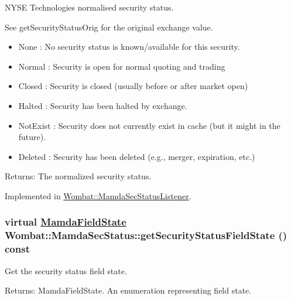 NYSE Technologies normalised security status. 

See get\-Security\-Status\-Orig for the original exchange value.

\begin{itemize}
\item None : No security status is known/available for this security. \item Normal : Security is open for normal quoting and trading \item Closed : Security is closed (usually before or after market open) \item Halted : Security has been halted by exchange. \item Not\-Exist : Security does not currently exist in cache (but it might in the future). \item Deleted : Security has been deleted (e.g., merger, expiration, etc.)  \end{itemize}


\begin{Desc}
\item[Returns:]The normalized security status. \end{Desc}


Implemented in \hyperlink{classWombat_1_1MamdaSecStatusListener_b1b6d523017888af27f4c3745c2e7fc0}{Wombat::Mamda\-Sec\-Status\-Listener}.\hypertarget{classWombat_1_1MamdaSecStatus_1b7b8b27b2bf2302c50b34261af61f39}{
\subsubsection[getSecurityStatusFieldState]{\setlength{\rightskip}{0pt plus 5cm}virtual \hyperlink{namespaceWombat_93aac974f2ab713554fd12a1fa3b7d2a}{Mamda\-Field\-State} Wombat::Mamda\-Sec\-Status::get\-Security\-Status\-Field\-State () const}}
\label{classWombat_1_1MamdaSecStatus_1b7b8b27b2bf2302c50b34261af61f39}


Get the security status field state. 

\begin{Desc}
\item[Returns:]Mamda\-Field\-State. An enumeration representing field state. \end{Desc}


